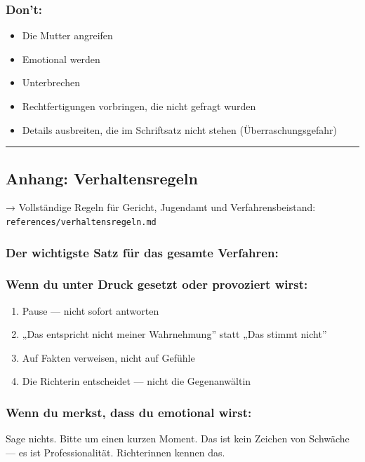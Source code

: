 \documentclass[
  11pt,
  a4paper,
]{article}
\providecommand{\tightlist}{%
  \setlength{\itemsep}{0pt}\setlength{\parskip}{0pt}}
\begin{document}
\subsubsection{Don't:}\label{dont}

\begin{itemize}
\tightlist
\item
  Die Mutter angreifen
\item
  Emotional werden
\item
  Unterbrechen
\item
  Rechtfertigungen vorbringen, die nicht gefragt wurden
\item
  Details ausbreiten, die im Schriftsatz nicht stehen
  (Überraschungsgefahr)
\end{itemize}

\begin{center}\rule{0.5\linewidth}{0.5pt}\end{center}

\subsection{Anhang: Verhaltensregeln}\label{anhang-verhaltensregeln}

→ Vollständige Regeln für Gericht, Jugendamt und Verfahrensbeistand:
\texttt{references/verhaltensregeln.md}

\subsubsection{Der wichtigste Satz für das gesamte
Verfahren:}\label{der-wichtigste-satz-fuxfcr-das-gesamte-verfahren}

\subsubsection{Wenn du unter Druck gesetzt oder provoziert
wirst:}\label{wenn-du-unter-druck-gesetzt-oder-provoziert-wirst}

\begin{enumerate}
\def\labelenumi{\arabic{enumi}.}
\tightlist
\item
  Pause --- nicht sofort antworten
\item
  „Das entspricht nicht meiner Wahrnehmung'' statt „Das stimmt nicht''
\item
  Auf Fakten verweisen, nicht auf Gefühle
\item
  Die Richterin entscheidet --- nicht die Gegenanwältin
\end{enumerate}

\subsubsection{Wenn du merkst, dass du emotional
wirst:}\label{wenn-du-merkst-dass-du-emotional-wirst}

Sage nichts. Bitte um einen kurzen Moment. Das ist kein Zeichen von
Schwäche --- es ist Professionalität. Richterinnen kennen das.
\end{document}
